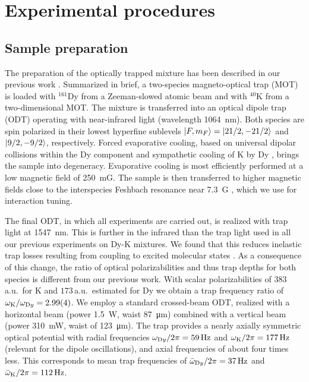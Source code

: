 \section{Experimental procedures}\label{sec:experimental}

\subsection{Sample preparation}\label{ssec:preparation}

The preparation of the optically trapped mixture 
has been described in our previous work \cite{Ravensbergen2018poa, Ye2022ool, Soave2023otf}. Summarized in brief, a two-species magneto-optical trap (MOT) is loaded with $^{161}$Dy from a Zeeman-slowed atomic beam and with $^{40}$K from a two-dimensional MOT. The mixture is transferred into an optical dipole trap (ODT) operating with near-infrared light (wavelength \SI{1064}{nm}). Both species are spin polarized in their lowest hyperfine sublevels $\ket{F,m_F}=\ket{21/2,-21/2}$ and $\ket{9/2,-9/2}$, respectively. Forced evaporative cooling, based on universal dipolar collisions within the Dy component \cite{Lu2012qdd, Aikawa2014rfd} and sympathetic cooling of K by Dy \cite{Ravensbergen2018poa}, brings the sample into degeneracy. Evaporative cooling is most efficiently performed at a low magnetic field of \SI{250}{mG}. The sample is then %
transferred to higher magnetic fields close to the interspecies Feshbach resonance near \SI{7.3}{G} \cite{Ye2022ool, Soave2023otf}, which we use for interaction tuning.

The final ODT, in which all experiments are carried out, is realized with trap light at \SI{1547}{nm}. This is further in the infrared than the trap light used in all our previous experiments on Dy-K mixtures. We found that this reduces inelastic trap losses resulting from coupling to excited molecular states \cite{Soave2023otf}. As a consequence of this change, the ratio of optical polarizabilities and thus trap depths for both species \cite{Ravensbergen2018ado} is different from our previous work. With scalar polarizabilities of ${383}$\,a.u.\ for K \cite{UDportal} and ${173}$\,a.u.\ estimated for Dy \cite{Dzuba2011dpa, Li2017oto} we obtain a trap frequency ratio of $\omega_{\textrm K}/\omega_{\textrm Dy} = 2.99(4)$. We employ a standard crossed-beam ODT, realized with a
horizontal beam (power \SI{1.5}{W}, waist \SI{87}{\micro\meter}) combined with a vertical beam (power \SI{310}{\milli\watt}, waist of \SI{123}{\micro\meter}). The trap provides a nearly axially symmetric optical potential with radial frequencies $\omega_{\textrm Dy}/2\pi = \SI{59}{Hz}$ and $\omega_{\textrm K}/2\pi = \SI{177}{Hz}$ (relevant for the dipole oscillations), and axial frequencies of about four times less. This corresponds to mean trap frequencies of $\bar{\omega}_{\textrm Dy}/2\pi = \SI{37}{Hz}$ and $\bar{\omega}_{\textrm K}/2\pi = \SI{112}{Hz}$.

